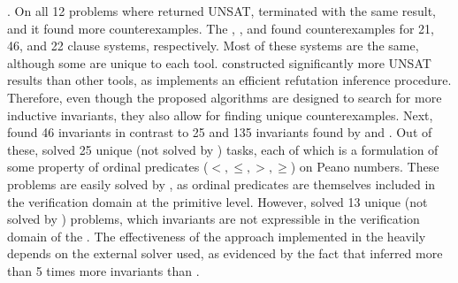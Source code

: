 \textbf{\theringen{}}. On all 12 problems where \eldarica{} returned UNSAT, \theringen{} terminated with the same result, and it found more counterexamples.
The \ringen{\cvc{}}, \ringen{\vampire{}}, and \racer{} found counterexamples for 21, 46, and 22 clause systems, respectively. Most of these systems are the same, although some are unique to each tool.
\ringen{\vampire{}} constructed significantly more UNSAT results than other tools, as \vampire{} implements an efficient refutation inference procedure.
Therefore, even though the proposed algorithms are designed to search for more inductive invariants, they also allow for finding unique counterexamples.
Next, \eldarica{} found 46 invariants in contrast to 25 and 135 invariants found by \ringen{\cvc{}} and \ringen{\vampire{}}.
Out of these, \eldarica{} solved 25 unique (not solved by \ringen{\cvc{}}) tasks, each of which is a formulation of some property of ordinal predicates ($ <, \le,>, \ge $) on Peano numbers.
These problems are easily solved by \eldarica{}, as ordinal predicates are themselves included in the \sizeelemclass{} verification domain at the primitive level.
However, \ringen{\cvc{}} solved 13 unique (not solved by \eldarica{}) problems, which invariants are not expressible in the verification domain of the \eldarica{}.
The effectiveness of the approach implemented in the \theringen{} heavily depends on the external solver used, as evidenced by the fact that \ringen{\vampire{}} inferred more than 5 times more invariants than \ringen{\cvc{}}.


